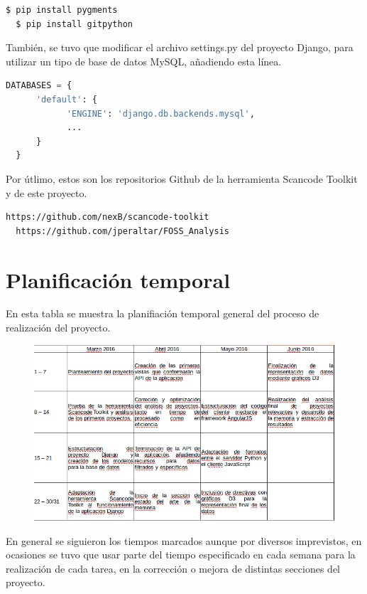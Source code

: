 \documentclass[a4paper, spanish, 12pt]{book}
\begin{document}
\begin{lstlisting}[language=bash]
  $ pip install pygments
  $ pip install gitpython
\end{lstlisting}

Tambi\'en, se tuvo que modificar el archivo settings.py del proyecto Django,
para utilizar un tipo de base de datos MySQL, a\~nadiendo esta l\'inea.

\begin{lstlisting}[language=python]
  DATABASES = {
      'default': {
            'ENGINE': 'django.db.backends.mysql',
            ...
      }
  }
\end{lstlisting}

Por \'utlimo, estos son los repositorios Github de la herramienta Scancode Toolkit
y de este proyecto.

\begin{lstlisting}[language=bash]
  https://github.com/nexB/scancode-toolkit
  https://github.com/jperaltar/FOSS_Analysis
\end{lstlisting}

\chapter{Planificaci\'on temporal}
\label{app:planificacion}

En esta tabla se muestra la planifiaci\'on temporal general del proceso de
realizaci\'on del proyecto.

\begin{figure}[H]
	\centering
	\includegraphics[width=16cm, keepaspectratio]{img/planificacion}
\end{figure}

En general se siguieron los tiempos marcados aunque por diversos imprevistos,
en ocasiones se tuvo que usar parte del tiempo especificado en cada semana para
la realizaci\'on de cada tarea, en la correcci\'on o mejora de distintas secciones
del proyecto.
\end{document}
